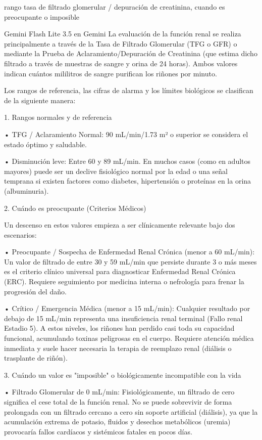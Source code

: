 \documentclass[12pt,a4paper,oneside]{book}
\begin{document}
\begin{iaprompt}
rango tasa de filtrado glomerular / depuración de creatinina, cuando es preocupante o imposible
\end{iaprompt}
\begin{iaresp} {Gemini Flash Lite 3.5 en Gemini}
La evaluación de la función renal se realiza principalmente a través de la Tasa de Filtrado Glomerular (TFG o GFR) o mediante la Prueba de Aclaramiento/Depuración de Creatinina (que estima dicho filtrado a través de muestras de sangre y orina de 24 horas). Ambos valores indican cuántos mililitros de sangre purifican los riñones por minuto.

Los rangos de referencia, las cifras de alarma y los límites biológicos se clasifican de la siguiente manera:

1. Rangos normales y de referencia

• TFG / Aclaramiento Normal: 90 mL/min/1.73 m² o superior se considera el estado óptimo y saludable.

• Disminución leve: Entre 60 y 89 mL/min. En muchos casos (como en adultos mayores) puede ser un declive fisiológico normal por la edad o una señal temprana si existen factores como diabetes, hipertensión o proteínas en la orina (albuminuria).

2. Cuándo es preocupante (Criterios Médicos)

Un descenso en estos valores empieza a ser clínicamente relevante bajo dos escenarios:

• Preocupante / Sospecha de Enfermedad Renal Crónica (menor a 60 mL/min): Un valor de filtrado de entre 30 y 59 mL/min que persiste durante 3 o más meses es el criterio clínico universal para diagnosticar Enfermedad Renal Crónica (ERC). Requiere seguimiento por medicina interna o nefrología para frenar la progresión del daño.

• Crítico / Emergencia Médica (menor a 15 mL/min): Cualquier resultado por debajo de 15 mL/min representa una insuficiencia renal terminal (Fallo renal Estadio 5). A estos niveles, los riñones han perdido casi toda su capacidad funcional, acumulando toxinas peligrosas en el cuerpo. Requiere atención médica inmediata y suele hacer necesaria la terapia de reemplazo renal (diálisis o trasplante de riñón).

3. Cuándo un valor es "imposible" o biológicamente incompatible con la vida

• Filtrado Glomerular de 0 mL/min: Fisiológicamente, un filtrado de cero significa el cese total de la función renal. No se puede sobrevivir de forma prolongada con un filtrado cercano a cero sin soporte artificial (diálisis), ya que la acumulación extrema de potasio, fluidos y desechos metabólicos (uremia) provocaría fallos cardíacos y sistémicos fatales en pocos días.


\end{iaresp}
\end{document}
